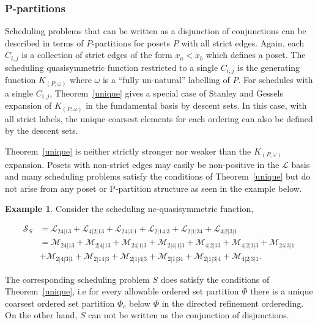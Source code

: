 \documentclass[12pt,reqno]{amsart}
\numberwithin{definition}{section}
\theoremstyle{definition}
\newtheorem{example}[definition]{Example}
\newcommand{\SSS}{\mathcal{S}}
\newcommand{\ncM}{\mathcal{M}}
\newcommand{\ncL}{\mathcal{L}}
\begin{document}
\subsubsection{P-partitions} Scheduling problems that can be written as a disjunction of conjunctions  can be
described in terms of $P$-partitions for posets $P$ with all strict
edges.  Again, each $C_{i,j}$ is a collection of strict edges of the
form $x_a < x_b$ which defines a poset.  The scheduling quasisymmetric function
 restricted to a single $C_{i,j}$ is the generating function
$K_{(P,\omega)}$ where $\omega$ is a ``fully un-natural'' labelling of
$P$.  For schedules with a single $C_{i,j}$, Theorem~\ref{unique}
gives a special case of Stanley and Gessels~\cite{Gessel,StanP} 
expansion of $K_{(P,\omega)}$ in the fundamental basis by descent
sets.  In this case, with all strict labels, the unique coarsest
elements for each ordering can also be defined by the descent sets.


Theorem~\ref{unique} is neither strictly stronger nor weaker than the
$K_{(P,\omega)}$ expansion.  Posets with non-strict edges may easily
be non-positive in the $\ncL$ basis and many scheduling problems
satisfy the conditions of Theorem~\ref{unique} but do not arise from
any poset or P-partition structure as seen in the example below.

\begin{example} 
Consider the scheduling nc-quasisymmetric function,

\begin{align*}
\SSS_S & = \ncL_{24|13} + \ncL_{4|2|13} + \ncL_{24|3|1} + \ncL_{2|14|3} + \ncL_{2|1|34} + \ncL_{4|2|3|1}\\
& = \ncM_{24|13} + \ncM_{2|4|13} + \ncM_{24|1|3} + \ncM_{2|4|1|3} + \ncM_{4|2|13} + \ncM_{4|2|1|3} + \ncM_{24|3|1}\\
& + \ncM_{2|4|3|1} + \ncM_{2|14|3} + \ncM_{2|1|4|3} + \ncM_{2|1|34} + \ncM_{2|1|3|4} + \ncM_{4|2|3|1}.
\end{align*}

The corresponding scheduling problem $S$ does satisfy the conditions of Theorem~\ref{unique}, i.e for every allowable ordered set partition $\Phi$ there is a unique coarsest ordered set partition $\Phi_c$ below $\Phi$ in the directed refinement ordereding.  On the other hand, $S$ can not be written as the conjunction of disjunctions.


\end{example}
\end{document}

